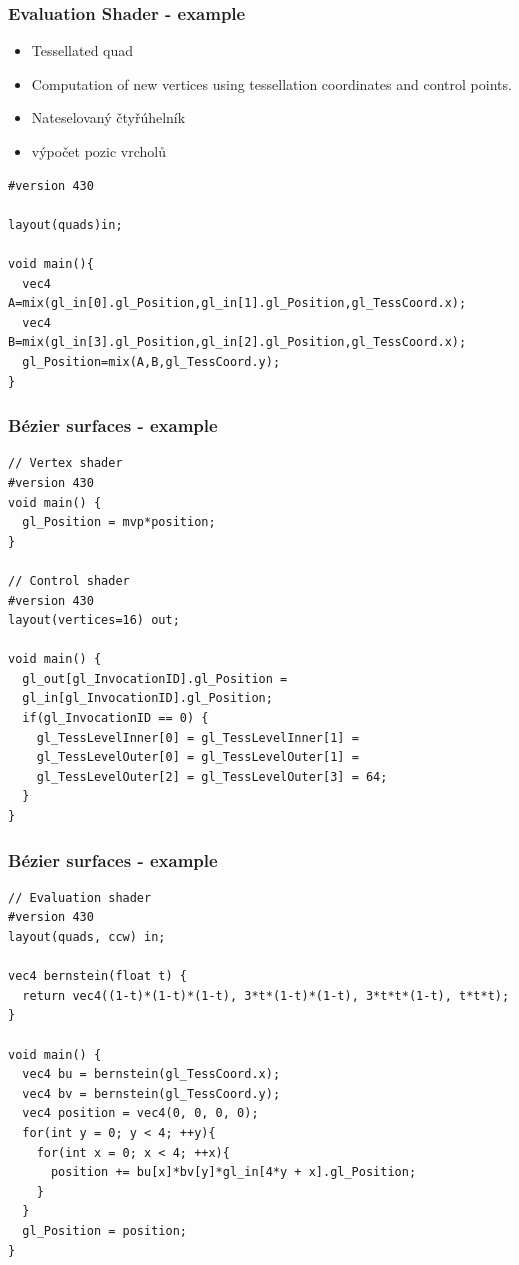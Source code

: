 \begin{frame}[fragile]
\frametitle{Evaluation Shader - example}
  \scriptsize
	\begin{itemize}
		\item Tessellated quad
		\item Computation of new vertices using tessellation coordinates and control points.
	\end{itemize}
	\begin{itemize}
		\item Nateselovaný čtyřúhelník
		\item výpočet pozic vrcholů
	\end{itemize}
	{\scriptsize
\begin{verbatim}
#version 430

layout(quads)in;

void main(){
  vec4 A=mix(gl_in[0].gl_Position,gl_in[1].gl_Position,gl_TessCoord.x);
  vec4 B=mix(gl_in[3].gl_Position,gl_in[2].gl_Position,gl_TessCoord.x);
  gl_Position=mix(A,B,gl_TessCoord.y);
}
	\end{verbatim}
	}
\end{frame}




\begin{frame}[fragile]
  \frametitle{Bézier surfaces - example}
	{\scriptsize
\begin{verbatim}
// Vertex shader	
#version 430
void main() {
  gl_Position = mvp*position;
}

// Control shader
#version 430
layout(vertices=16) out;

void main() {
  gl_out[gl_InvocationID].gl_Position =
  gl_in[gl_InvocationID].gl_Position;
  if(gl_InvocationID == 0) {
    gl_TessLevelInner[0] = gl_TessLevelInner[1] = 
    gl_TessLevelOuter[0] = gl_TessLevelOuter[1] =
    gl_TessLevelOuter[2] = gl_TessLevelOuter[3] = 64;
  }
}
	\end{verbatim}
	}
\end{frame}

\begin{frame}[fragile]
    \frametitle{Bézier surfaces - example}
  	{\scriptsize
\begin{verbatim}
// Evaluation shader
#version 430
layout(quads, ccw) in;

vec4 bernstein(float t) {
  return vec4((1-t)*(1-t)*(1-t), 3*t*(1-t)*(1-t), 3*t*t*(1-t), t*t*t);
}

void main() {
  vec4 bu = bernstein(gl_TessCoord.x);
  vec4 bv = bernstein(gl_TessCoord.y);
  vec4 position = vec4(0, 0, 0, 0);
  for(int y = 0; y < 4; ++y){
    for(int x = 0; x < 4; ++x){
      position += bu[x]*bv[y]*gl_in[4*y + x].gl_Position;
    }
  }
  gl_Position = position;
}
  	\end{verbatim}
		}
\end{frame}


